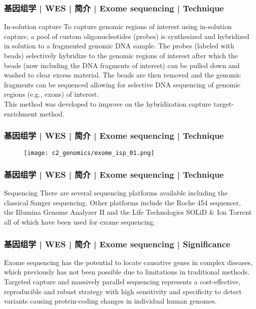 \begin{frame}
  \frametitle{基因组学 | WES | 简介 | Exome sequencing | Technique}
  \begin{block}{In-solution capture}
 To capture genomic regions of interest using in-solution capture, a pool of custom oligonucleotides (probes) is synthesized and hybridized in solution to a fragmented genomic DNA sample. The probes (labeled with beads) selectively hybridize to the genomic regions of interest after which the beads (now including the DNA fragments of interest) can be pulled down and washed to clear excess material. The beads are then removed and the genomic fragments can be sequenced allowing for selective DNA sequencing of genomic regions (e.g., exons) of interest.\\
 \vspace{1em}
 This method was developed to improve on the hybridization capture target-enrichment method.
  \end{block}
\end{frame}

\begin{frame}
  \frametitle{基因组学 | WES | 简介 | Exome sequencing | Technique}
  \begin{figure}
    \centering
    \texttt{[image: c2\_genomics/exome\_isp\_01.png]}
  \end{figure}
\end{frame}

\begin{frame}
  \frametitle{基因组学 | WES | 简介 | Exome sequencing | Technique}
  \begin{block}{Sequencing}
 There are several sequencing platforms available including the classical Sanger sequencing. Other platforms include the Roche 454 sequencer, the Illumina Genome Analyzer II and the Life Technologies SOLiD \& Ion Torrent all of which have been used for exome sequencing.
  \end{block}
\end{frame}

\begin{frame}
  \frametitle{基因组学 | WES | 简介 | Exome sequencing | Significance}
  Exome sequencing has the potential to locate causative genes in complex diseases, which previously has not been possible due to limitations in traditional methods.\\
  \vspace{1em}
  Targeted capture and massively parallel sequencing represents a cost-effective, reproducible and robust strategy with high sensitivity and specificity to detect variants causing protein-coding changes in individual human genomes.
\end{frame}

